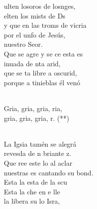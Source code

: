 \documentclass[12pt]{article}
\begin{document}
\begin{multicols*}{2}
\begin{cancion}%
	ulten losoros de losnges, \\
	elten los mists de Ds \\
	y que en las troms de vicria\\
	por el unfo de Jesús, \\
	nuestro Seor.\\
	Que se agre y se ce esta es\\
	inuada de nta arid, \\
	que se ta libre a oscurid,\\
	porque a  tinieblas él venó\\\jump\\
	\begin{chorus}%
	Gria, gria, gria, ria,\\
	gria, gria, gria, r. (**)\\
	\end{chorus}%
	\jump\\
	La Igsia tamén se alegrá\\
	revesda de n briante z.\\
	Que ree este lo al aclar\\
	nuestras es cantando su bond.\\
	Esta  la esta de la scu\\
	Esta  la che en e lle  \\
	la libera su lo Isra,\\

\end{cancion}
\end{multicols*}
\end{document}

